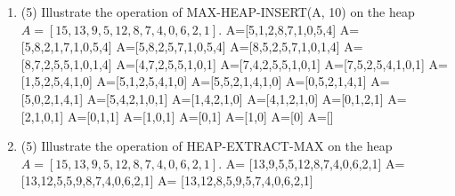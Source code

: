 \documentclass[12pt]{article}
\newenvironment{problem}[2][Problem]{\begin{trivlist}
\item[\hskip \labelsep {\bfseries #1}\hskip \labelsep {\bfseries #2.}]}{\end{trivlist}}
\begin{document}
\begin{enumerate}
\item (5) Illustrate the operation of MAX-HEAP-INSERT(A, 10) on the heap
$A = [15, 13, 9, 5, 12, 8, 7, 4, 0, 6, 2, 1]$. \newline
A=[5,1,2,8,7,1,0,5,4]\newline
A=[5,8,2,1,7,1,0,5,4]\newline
A=[5,8,2,5,7,1,0,5,4]\newline
A=[8,5,2,5,7,1,0,1,4]\newline
A=[8,7,2,5,5,1,0,1,4]\newline
A=[4,7,2,5,5,1,0,1]\newline
A=[7,4,2,5,5,1,0,1]\newline
A=[7,5,2,5,4,1,0,1]\newline
A=[1,5,2,5,4,1,0]\newline
A=[5,1,2,5,4,1,0]\newline
A=[5,5,2,1,4,1,0]\newline
A=[0,5,2,1,4,1]\newline
A=[5,0,2,1,4,1]\newline
A=[5,4,2,1,0,1]\newline
A=[1,4,2,1,0]\newline
A=[4,1,2,1,0]\newline
A=[0,1,2,1]\newline
A=[2,1,0,1]\newline
A=[0,1,1]\newline
A=[1,0,1]\newline
A=[0,1]\newline
A=[1,0]\newline
A=[0]\newline
A=[]
\item (5) Illustrate the operation of HEAP-EXTRACT-MAX on the heap
$A = [15, 13, 9, 5, 12, 8, 7, 4, 0, 6, 2, 1]$. \newline
A= [13,9,5,5,12,8,7,4,0,6,2,1] \newline
A= [13,12,5,5,9,8,7,4,0,6,2,1] \newline
A= [13,12,8,5,9,5,7,4,0,6,2,1] 

\end{enumerate}
\end{document}
